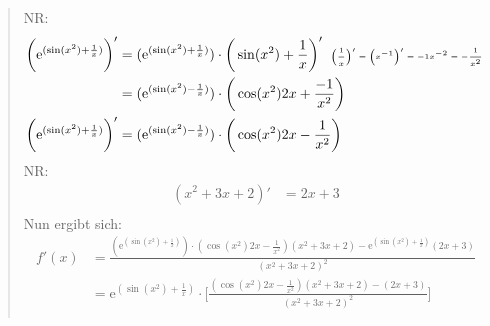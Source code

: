 \begin{quote}
	NR:\\
	\begin{align*}
	\bigg(\mathrm{e}^{(\sin(x^2)+\frac{1}{x})}\bigg)'&=(\mathrm{e}^{(\sin(x^2)+\frac{1}{x})})\cdot \bigg(\sin(x^2)+\frac{1}{x}\bigg)'\;\;\text{\tiny $ \bigg(\frac{1}{x}\bigg)'=\bigg(x^{-1}\bigg)'=-1x^{-2}=-\frac{1}{x^2} $ }\\
	&=(\mathrm{e}^{(\sin(x^2)-\frac{1}{x})})\cdot \bigg(\cos(x^2)2x+\frac{-1}{x^2}\bigg)\\
	\bigg(\mathrm{e}^{(\sin(x^2)+\frac{1}{x})}\bigg)'&=(\mathrm{e}^{(\sin(x^2)-\frac{1}{x})})\cdot 	\bigg(\cos(x^2)2x-\frac{1}{x^2}\bigg)\\
		\end{align*}
	NR:\\
	\begin{align*}
	(x^2+3x+2)'&=2x+3\\
	\end{align*}
	Nun ergibt sich:\\
	\begin{align*}
	f'(x)&=\frac{(\mathrm{e}^{(\sin(x^2)+\frac{1}{x})})\cdot (\cos(x^2)2x-\frac{1}{x^2})(x^2+3x+2)-\mathrm{e}^{(\sin(x^2)+\frac{1}{x})}(2x+3)}{(x^2+3x+2)^2}\\
	&=\mathrm{e}^{(\sin(x^2)+\frac{1}{x})} \cdot \bigg[\frac{ (\cos(x^2)2x-\frac{1}{x^2})(x^2+3x+2)-(2x+3)}{(x^2+3x+2)^2}\bigg]\\
	\end{align*}
\end{quote}
